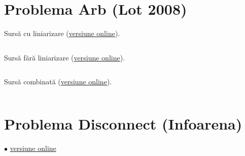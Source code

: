\documentclass[../main.tex]{subfiles}
\begin{document}
\inputminted{cpp}{../src/trees/distinct-colors.cpp}

\section{Problema Arb (Lot 2008)}
\label{code:arb}

Sursă cu liniarizare (\href{https://kilonova.ro/submissions/884345}{versiune online}).

\inputminted{cpp}{../src/trees/arb-1.cpp}

Sursă fără liniarizare (\href{https://kilonova.ro/submissions/884065}{versiune online}).

\inputminted{cpp}{../src/trees/arb-2.cpp}

Sursă combinată (\href{https://kilonova.ro/submissions/946414}{versiune online}).

\inputminted{cpp}{../src/trees/arb-3.cpp}

\section{Problema Disconnect (Infoarena)}
\label{code:disconnect}
$\bullet$
\href{https://www.infoarena.ro/job_detail/3258832?action=view-source}{versiune online}

\inputminted{cpp}{../src/trees/disconnect.cpp}
\end{document}
